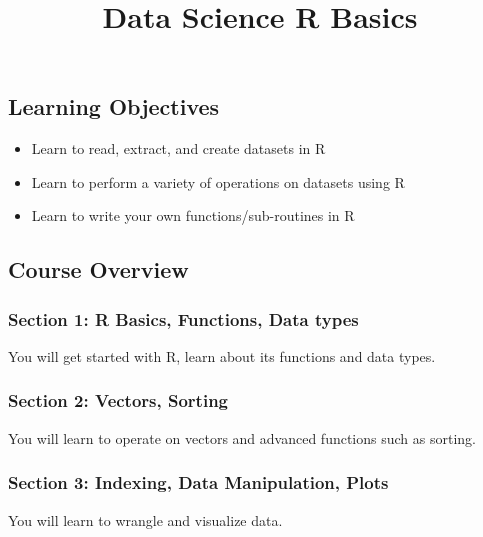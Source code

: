 \documentclass[
]{article}
\title{Data Science R Basics}
\author{}
\date{\vspace{-2.5em}}
\providecommand{\tightlist}{%
  \setlength{\itemsep}{0pt}\setlength{\parskip}{0pt}}
\begin{document}
\maketitle

\hypertarget{learning-objectives}{%
\subsection{Learning Objectives}\label{learning-objectives}}

\begin{itemize}
\tightlist
\item
  Learn to read, extract, and create datasets in R
\item
  Learn to perform a variety of operations on datasets using R
\item
  Learn to write your own functions/sub-routines in R
\end{itemize}

\hypertarget{course-overview}{%
\subsection{Course Overview}\label{course-overview}}

\hypertarget{section-1-r-basics-functions-data-types}{%
\subsubsection{Section 1: R Basics, Functions, Data
types}\label{section-1-r-basics-functions-data-types}}

You will get started with R, learn about its functions and data types.

\hypertarget{section-2-vectors-sorting}{%
\subsubsection{Section 2: Vectors,
Sorting}\label{section-2-vectors-sorting}}

You will learn to operate on vectors and advanced functions such as
sorting.

\hypertarget{section-3-indexing-data-manipulation-plots}{%
\subsubsection{Section 3: Indexing, Data Manipulation,
Plots}\label{section-3-indexing-data-manipulation-plots}}

You will learn to wrangle and visualize data.
\end{document}

